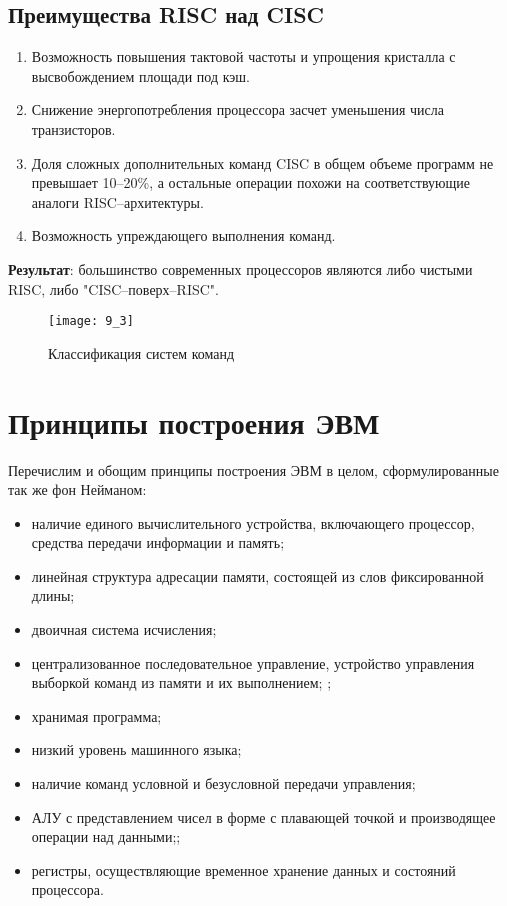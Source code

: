 \subsection{Преимущества RISC над CISC}
\begin{enumerate}
  \item Возможность повышения тактовой частоты и упрощения кристалла с высвобождением площади под кэш.
  \item Снижение энергопотребления процессора засчет уменьшения числа транзисторов.
  \item Доля сложных дополнительных команд CISC в общем объеме программ не превышает 10--20\%, а остальные операции похожи на соответствующие аналоги RISC--архитектуры.
  \item Возможность упреждающего выполнения команд.
\end{enumerate}
\textbf{Результат}: большинство современных процессоров являются либо чистыми RISC, либо "CISC--поверх--RISC".
\begin{figure}[h]
\centering
\texttt{[image: 9\_3]}
\caption{Классификация систем команд}
\label{commands}
\end{figure}
\section{Принципы построения ЭВМ}
Перечислим и обощим принципы построения ЭВМ в целом, сформулированные так же фон Нейманом:
\begin{itemize}
  \item наличие единого вычислительного устройства, включающего процессор, средства передачи информации и память;
  \item линейная структура адресации памяти, состоящей из слов фиксированной длины;
  \item двоичная система исчисления;
  \item централизованное последовательное управление, устройство управления выборкой команд из памяти и их выполнением; ;
  \item хранимая программа;
  \item низкий уровень машинного языка;
  \item наличие команд условной и безусловной передачи управления;
  \item АЛУ с представлением чисел в форме с плавающей точкой и производящее операции над данными;;
  \item регистры, осуществляющие временное хранение данных и состояний процессора.
\end{itemize}

